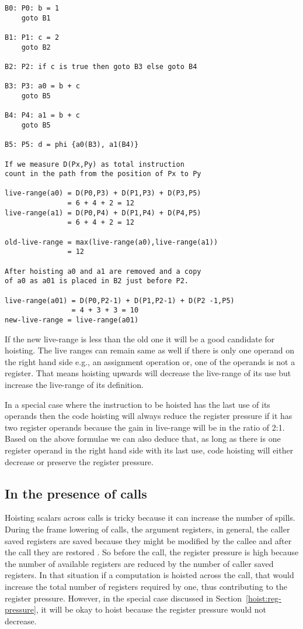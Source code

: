 \documentclass{sig-alternate}
\begin{document}
\begin{verbatim}
B0: P0: b = 1
    goto B1

B1: P1: c = 2
    goto B2

B2: P2: if c is true then goto B3 else goto B4

B3: P3: a0 = b + c
    goto B5

B4: P4: a1 = b + c
    goto B5

B5: P5: d = phi {a0(B3), a1(B4)}

If we measure D(Px,Py) as total instruction
count in the path from the position of Px to Py

live-range(a0) = D(P0,P3) + D(P1,P3) + D(P3,P5)
               = 6 + 4 + 2 = 12
live-range(a1) = D(P0,P4) + D(P1,P4) + D(P4,P5)
               = 6 + 4 + 2 = 12

old-live-range = max(live-range(a0),live-range(a1))
               = 12

After hoisting a0 and a1 are removed and a copy
of a0 as a01 is placed in B2 just before P2.

live-range(a01) = D(P0,P2-1) + D(P1,P2-1) + D(P2 -1,P5)
                = 4 + 3 + 3 = 10
new-live-range = live-range(a01)
\end{verbatim}

If the new live-range is less than the old one it will be a good candidate for
hoisting. The live ranges can remain same as well if there is only one operand
on the right hand side e.g., an assignment operation or, one of the operands is
not a register. That means hoisting upwards will decrease the live-range of its
use but increase the live-range of its definition.

In a special case where the instruction to be hoisted has the last use of its
operands then the code hoisting will always reduce the register pressure if it
has two register operands because the gain in live-range will be in the ratio of
2:1. Based on the above formulae we can also deduce that, as long as there is
one register operand in the right hand side with its last use, code hoisting
will either decrease or preserve the register pressure.

\subsection{In the presence of calls}
\label{cost:across-calls}
Hoisting scalars across calls is tricky because it can increase the number of
spills. During the frame lowering of calls, the argument registers, in general,
the caller saved registers are saved because they might be modified by the
callee and after the call they are restored \cite{frame-lowering}. So before the
call, the register pressure is high because the number of available registers
are reduced by the number of caller saved registers. In that situation if a
computation is hoisted across the call, that would increase the total number of
registers required by one, thus contributing to the register pressure. However,
in the special case discussed in Section~\ref{hoist:reg-pressure}, it will be
okay to hoist because the register pressure would not decrease.
\end{document}
